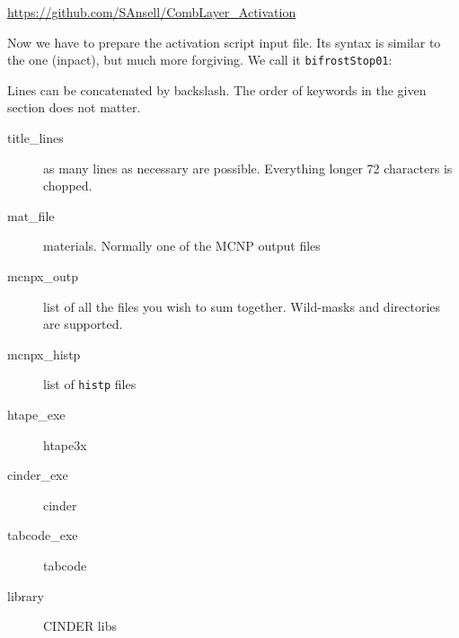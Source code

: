 \href{https://github.com/SAnsell/CombLayer\_Activation}{https://github.com/SAnsell/CombLayer\_Activation}

Now we have to prepare the activation script input file. Its syntax is similar to the \cinder one (inpact), but much more forgiving.
We call it {\tt bifrostStop01}:


Lines can be concatenated by backslash. The order of keywords in the given section does not matter.

\begin{description}
  \item[title\_lines] as many lines as necessary are possible. Everything longer 72 characters is chopped.
  \item[mat\_file] materials. Normally one of the MCNP output files
   \item[mcnpx\_outp] list of all the files you wish to sum together. Wild-masks and directories are supported.
   \item[mcnpx\_histp] list of {\tt histp} files
   \item[htape\_exe] htape3x
   \item[cinder\_exe] cinder
   \item[tabcode\_exe] tabcode
   \item[library] CINDER libs
\end{description}